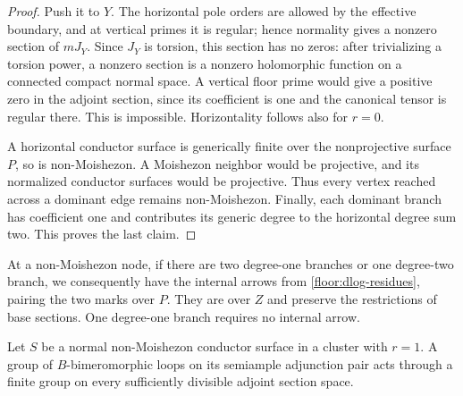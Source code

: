 \begin{proof}
Push it to $Y$.  The horizontal pole orders are allowed by the
effective boundary, and at vertical primes it is regular; hence
normality gives a nonzero section of $mJ_Y$.  Since $J_Y$ is
torsion, this section has no zeros: after trivializing a torsion
power, a nonzero section is a nonzero holomorphic function on a
connected compact normal space.  A vertical floor prime would
give a positive zero in the adjoint section, since its coefficient
is one and the canonical tensor is regular there.  This is
impossible.  Horizontality follows also for $r=0$.

A horizontal conductor surface is generically finite over the
nonprojective surface $P$, so is non-Moishezon.  A Moishezon
neighbor would be projective, and its normalized conductor
surfaces would be projective.  Thus every vertex reached across
a dominant edge remains non-Moishezon.  Finally, each dominant
branch has coefficient one and contributes its generic degree
to the horizontal degree sum two.  This proves the last claim.
\end{proof}

At a non-Moishezon node, if there are two degree-one branches or
one degree-two branch, we consequently have the internal arrows
from \eqref{floor:dlog-residues}, pairing the two marks over $P$.
They are over $Z$ and preserve the restrictions of base sections.
One degree-one branch requires no internal arrow.

\begin{lemma}
\label{floor:nonprojective-loops}
Let $S$ be a normal non-Moishezon conductor surface in a cluster
with $r=1$.  A group of $B$-bimeromorphic loops on its semiample
adjunction pair acts through a finite group on every sufficiently
divisible adjoint section space.
\end{lemma}

